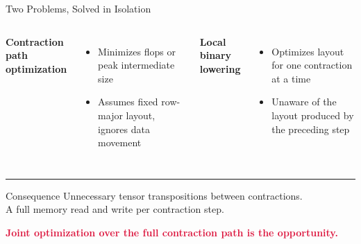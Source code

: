 \documentclass[aspectratio=169,10pt]{beamer}
\begin{document}
\begin{frame}{Two Problems, Solved in Isolation}

\begin{columns}[T]
\textbf{\color{Navy}Contraction path optimization}
\begin{itemize}
  \item Minimizes flops or peak intermediate size
  \item Assumes fixed row-major layout, ignores data movement
\end{itemize}

\textbf{\color{Navy}Local binary lowering}
\begin{itemize}
  \item Optimizes layout for one contraction at a time
  \item Unaware of the layout produced by the preceding step
\end{itemize}
\end{columns}

\bigskip\hrule\bigskip

\begin{block}{Consequence}
\centering
Unnecessary tensor transpositions between contractions.\\
A full memory read and write per contraction step.
\end{block}

\bigskip
\centering
\textcolor{Crimson}{\bfseries Joint optimization over the full contraction path is the opportunity.}
\end{frame}
\end{document}
